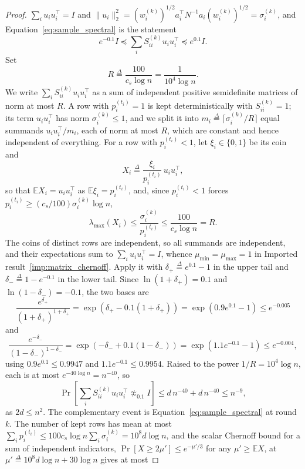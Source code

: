 \documentclass[11pt]{article}
\newcommand{\defeq}{\stackrel{\Delta}{=}}
\newcommand{\E}{\mathbb E}
\begin{document}
\begin{proof}
$\sum_i u_i u_i^\top = I$ and
$\|u_i\|_2^{2} = (w^{(k)}_i)^{1/2} a_i^\top N^{-1} a_i (w^{(k)}_i)^{1/2} = \sigma^{(k)}_i$,
and Equation~\eqref{eq:sample_spectral} is the statement
\[
e^{-0.1} I
\preceq
\sum_i S^{(k)}_{ii} u_i u_i^\top
\preceq
e^{0.1} I .
\]
Set
\[
R
\defeq
\frac{100}{c_s \log n}
=
\frac{1}{10^{4} \log n} .
\]
We write $\sum_i S^{(k)}_{ii} u_i u_i^\top$ as a sum of independent positive
semidefinite matrices of norm at most $R$.
A row with $p_i^{(t_i)} = 1$ is kept deterministically with
$S^{(k)}_{ii} = 1$; its term
$u_i u_i^\top$ has norm
$\sigma^{(k)}_i \le 1$, and we split it into
$m_i \defeq \lceil \sigma^{(k)}_i / R \rceil$ equal summands
$u_i u_i^\top / m_i$, each of norm at most
$R$, which are constant and hence independent of everything.
For a row with $p_i^{(t_i)} < 1$, let
$\xi_i \in \{0, 1\}$ be its coin and
\[
X_i
\defeq
\frac{\xi_i}{p_i^{(t_i)}} \, u_i u_i^\top ,
\]
so that $\E X_i = u_i u_i^\top$ as
$\E \xi_i = p_i^{(t_i)}$, and, since
$p_i^{(t_i)} < 1$ forces
$p_i^{(t_i)} \ge (c_s / 100) \sigma^{(k)}_i \log n$,
\[
\lambda_{\max}(X_i)
\le
\frac{\sigma^{(k)}_i}{p_i^{(t_i)}}
\le
\frac{100}{c_s \log n}
=
R .
\]
The coins of distinct rows are independent, so all summands are independent, and
their expectations sum to $\sum_i u_i u_i^\top = I$, whence
$\mu_{\min} = \mu_{\max} = 1$ in Imported result~\ref{imp:matrix_chernoff}.
Apply it with $\delta_{+} \defeq e^{0.1} - 1$ in the upper tail and
$\delta_{-} \defeq 1 - e^{-0.1}$ in the lower tail.
Since $\ln(1 + \delta_{+}) = 0.1$ and
$\ln(1 - \delta_{-}) = -0.1$, the two bases are
\[
\frac{e^{\delta_{+}}}{(1 + \delta_{+})^{1 + \delta_{+}}}
=
\exp\left( \delta_{+} - 0.1 (1 + \delta_{+}) \right)
=
\exp\left( 0.9 e^{0.1} - 1 \right)
\le
e^{-0.005}
\]
and
\[
\frac{e^{-\delta_{-}}}{(1 - \delta_{-})^{1 - \delta_{-}}}
=
\exp\left( - \delta_{-} + 0.1 (1 - \delta_{-}) \right)
=
\exp\left( 1.1 e^{-0.1} - 1 \right)
\le
e^{-0.004} ,
\]
using $0.9 e^{0.1} \le 0.9947$ and
$1.1 e^{-0.1} \le 0.9954$.
Raised to the power $1 / R = 10^{4} \log n$, each is at most
$e^{-40 \log n} = n^{-40}$, so
\[
\Pr\left[ \sum_i S^{(k)}_{ii} u_i u_i^\top
\not\approx_{0.1} I \right]
\le
d \, n^{-40} + d \, n^{-40}
\le
n^{-9} ,
\]
as $2 d \le n^{2}$.
The complementary event is Equation~\eqref{eq:sample_spectral} at round $k$.
The number of kept rows has mean at most
$\sum_i p_i^{(t_i)} \le 100 c_s \log n \sum_i \sigma^{(k)}_i = 10^{8} d \log n$,
and the scalar Chernoff bound for a sum of independent indicators,
$\Pr[X \ge 2 \mu'] \le e^{-\mu' / 3}$ for any
$\mu' \ge \E X$, at
$\mu' \defeq 10^{8} d \log n + 30 \log n$ gives at most

\end{proof}
\end{document}
